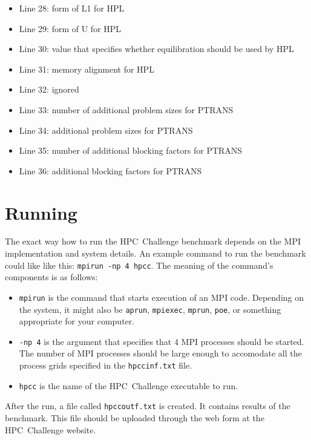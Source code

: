 \documentclass[twocolumn]{article}
\begin{document}
\begin{itemize}
\item Line 28: form of L1 for HPL
\item Line 29: form of U for HPL
\item Line 30: value that specifies whether equilibration should be used by HPL
\item Line 31: memory alignment for HPL
\item Line 32: ignored
\item Line 33: number of additional problem sizes for PTRANS
\item Line 34: additional problem sizes for PTRANS
\item Line 35: number of additional blocking factors for PTRANS
\item Line 36: additional blocking factors for PTRANS
\end{itemize}

\section{Running}
The exact way how to run the HPC~Challenge benchmark depends on the
MPI implementation and system details.  An example command to run the
benchmark could like like this: \texttt{mpirun -np 4 hpcc}. The
meaning of the command's components is as follows:
\begin{itemize}
\item \texttt{mpirun} is the command that starts execution of an MPI
code. Depending on the system, it might also be \texttt{aprun},
\texttt{mpiexec}, \texttt{mprun}, \texttt{poe}, or something
appropriate for your computer.

\item \texttt{-np 4} is the argument that specifies that 4 MPI
processes should be started. The number of MPI processes should be
large enough to accomodate all the process grids specified in the
\texttt{hpccinf.txt} file.

\item \texttt{hpcc} is the name of the HPC~Challenge executable to
run.
\end{itemize}

After the run, a file called \texttt{hpccoutf.txt} is created. It
contains results of the benchmark. This file should be uploaded
through the web form at the HPC~Challenge website.
\end{document}
